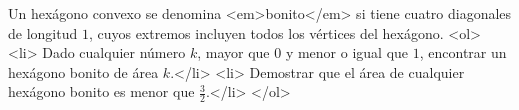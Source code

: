 Un hexágono convexo se denomina <em>bonito</em> si tiene cuatro diagonales de longitud $1$, cuyos extremos incluyen todos los vértices del hexágono.
<ol>
  <li> Dado cualquier número $k$, mayor que $0$ y menor o igual que $1$, encontrar un hexágono bonito de área $k$.</li>
  <li> Demostrar que el área de cualquier hexágono bonito es menor que $\frac{3}{2}$.</li>
</ol>
